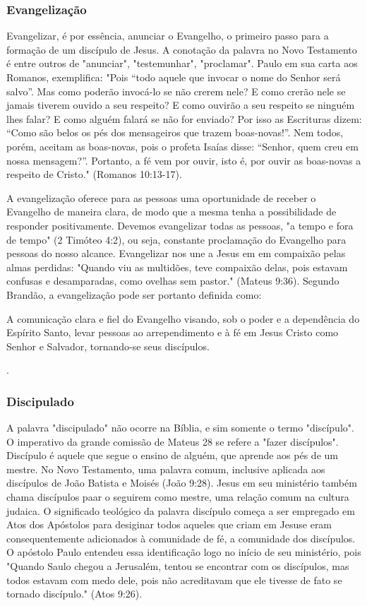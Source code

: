 \documentclass[
	12pt,				%
	openright,			%
	twoside,			%
	a4paper,			%
	english,			%
	french,				%
	spanish,			%
	brazil				%
	]{abntex2}
\begin{document}
\subsubsection{Evangelização}
Evangelizar, é por essência, anunciar o Evangelho, o primeiro passo para a formação de um discípulo de Jesus. A conotação da palavra no Novo Testamento é entre outros de "anunciar", "testemunhar", "proclamar"\cite[54]{brandao}. Paulo em sua carta aos Romanos, exemplifica: "Pois “todo aquele que invocar o nome do Senhor será salvo”. Mas como poderão invocá-lo se não crerem nele? E como crerão nele se jamais tiverem ouvido a seu respeito? E como ouvirão a seu respeito se ninguém lhes falar? E como alguém falará se não for enviado? Por isso as Escrituras dizem: “Como são belos os pés dos mensageiros que trazem boas-novas!”. Nem todos, porém, aceitam as boas-novas, pois o profeta Isaías disse: “Senhor, quem creu em nossa mensagem?”. Portanto, a fé vem por ouvir, isto é, por ouvir as boas-novas a respeito de Cristo." (Romanos 10:13-17).

A evangelização oferece para as pessoas uma oportunidade de receber o Evangelho de maneira clara, de modo que a mesma tenha a possibilidade de responder positivamente. Devemos evangelizar todas as pessoas, "a tempo e fora de tempo" (2 Timóteo 4:2), ou seja, constante proclamação do Evangelho para pessoas do nosso alcance. Evangelizar nos une a Jesus em em compaixão pelas almas perdidas: "Quando viu as multidões, teve compaixão delas, pois estavam confusas e desamparadas, como ovelhas sem pastor." (Mateus 9:36). Segundo Brandão, a evangelização pode ser portanto definida como: \begin{citacao}A comunicação clara e fiel do Evangelho visando, sob o poder e a dependência do Espírito Santo, levar pessoas ao arrependimento e à fé em Jesus Cristo como Senhor e Salvador, tornando-se seus discípulos.\end{citacao}\cite[57]{brandao}.
	
\subsubsection{Discipulado}

A palavra "discipulado" não ocorre na Bíblia, e sim somente o termo "discípulo". O imperativo da grande comissão de Mateus 28 se refere a "fazer discípulos". Discípulo é aquele que segue o ensino de alguém, que aprende aos pés de um mestre. No Novo Testamento, uma palavra comum, inclusive aplicada aos discípulos de João Batista e Moisés (João 9:28). Jesus em seu ministério também chama discípulos paar o seguirem como mestre, uma relação comum na cultura judaica\cite[59]{brandao}. O significado teológico da palavra discípulo começa a ser empregado em Atos dos Apóstolos para desiginar todos aqueles que criam em Jesuse eram consequentemente adicionados à comunidade de fé, a comunidade dos discípulos. O apóstolo Paulo entendeu essa identificação logo no início de seu ministério, pois "Quando Saulo chegou a Jerusalém, tentou se encontrar com os discípulos, mas todos estavam com medo dele, pois não acreditavam que ele tivesse de fato se tornado discípulo." (Atos 9:26). 
\end{document}
